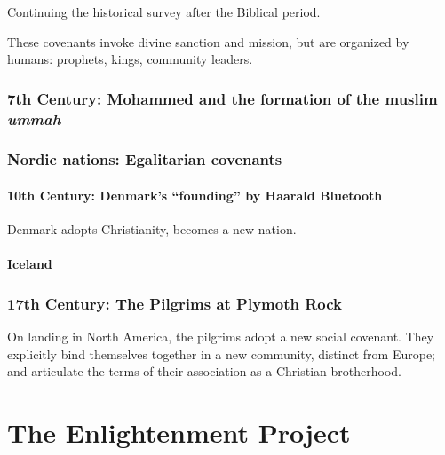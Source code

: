 \documentclass[
]{book}
\begin{document}
Continuing the historical survey after the Biblical period.

These covenants invoke divine sanction and mission, but are organized by humans: prophets, kings, community leaders.

\hypertarget{th-century-mohammed-and-the-formation-of-the-muslim-ummah}{%
\section{\texorpdfstring{7th Century: Mohammed and the formation of the muslim \emph{ummah}}{7th Century: Mohammed and the formation of the muslim ummah}}\label{th-century-mohammed-and-the-formation-of-the-muslim-ummah}}

\hypertarget{nordic-nations-egalitarian-covenants}{%
\section{Nordic nations: Egalitarian covenants}\label{nordic-nations-egalitarian-covenants}}

\hypertarget{th-century-denmarks-founding-by-haarald-bluetooth}{%
\subsection{10th Century: Denmark's ``founding'' by Haarald Bluetooth}\label{th-century-denmarks-founding-by-haarald-bluetooth}}

Denmark adopts Christianity, becomes a new nation.

\hypertarget{iceland}{%
\subsection{Iceland}\label{iceland}}

\hypertarget{th-century-the-pilgrims-at-plymoth-rock}{%
\section{17th Century: The Pilgrims at Plymoth Rock}\label{th-century-the-pilgrims-at-plymoth-rock}}

On landing in North America, the pilgrims adopt a new social covenant. They explicitly bind themselves together in a new community, distinct from Europe; and articulate the terms of their association as a Christian brotherhood.

\hypertarget{part-the-enlightenment-project}{%
\part{The Enlightenment Project}\label{part-the-enlightenment-project}}
\end{document}
